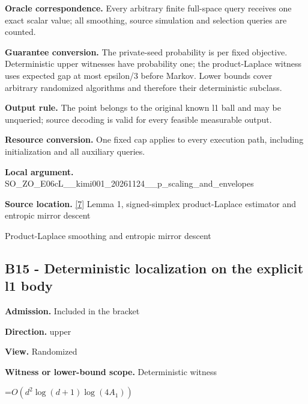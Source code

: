 \documentclass[10pt,a4paper]{article}
\newcommand{\AtlasMath}[1]{\par\begingroup\centering\setbox0=\hbox{$\displaystyle #1$}\ifdim\wd0>1.4\linewidth\typeout{ATLAS WIDE FORMULA: \the\wd0}\fi\ifdim\wd0>\linewidth\resizebox{\linewidth}{!}{\box0}\else\box0\fi\par\endgroup}
\begin{document}
\textbf{Oracle correspondence.} Every arbitrary finite full-space query receives one exact scalar value; all smoothing, source simulation and selection queries are counted.



\textbf{Guarantee conversion.} The private-seed probability is per fixed objective. Deterministic upper witnesses have probability one; the product-Laplace witness uses expected gap at most epsilon/3 before Markov. Lower bounds cover arbitrary randomized algorithms and therefore their deterministic subclass.



\textbf{Output rule.} The point belongs to the original known l1 ball and may be unqueried; source decoding is valid for every feasible measurable output.



\textbf{Resource conversion.} One fixed cap applies to every execution path, including initialization and all auxiliary queries.



\textbf{Local argument.} SO\_ZO\_E06cL\_\_kimi001\_202\allowbreak{}61124\_\_p\_scaling\_and\_env\allowbreak{}elopes



\textbf{Source location.} \href{https://github.com/WU-Wendao/Colombo/blob/main/colombo_sensorium/Complexity_altas/data/sources/colombo/COLOMBO_KIMI_001/kimi_001.pdf}{[7]} Lemma 1, signed-simplex product-Laplace estimator and entropic mirror descent



Product-Laplace smoothing and entropic mirror descent



\subsection{B15 - Deterministic localization on the explicit l1 body}


\textbf{Admission.} Included in the bracket



\textbf{Direction.} upper



\textbf{View.} Randomized



\textbf{Witness or lower-bound scope.} Deterministic witness



\AtlasMath{O(d^2\log(d+1)\log(4A_1))}
\end{document}

